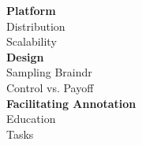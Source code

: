 \documentclass[../presentation.tex]{subfiles}
\begin{document}
\twocolumn
\null
\vfill

\large{\textbf{Platform}} \\
\large{Distribution} \\
\large{Scalability} \\

\large{\textbf{Design}} \\
\large{Sampling Braindr} \\
\large{Control vs. Payoff} \\

\large{\textbf{Facilitating Annotation}} \\
\large{Education} \\
\large{Tasks}

\vfill
\pagebreak
\null
\vfill

\hspace{0.04\linewidth}

\vfill
\onecolumn
\end{document}
